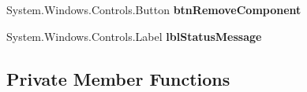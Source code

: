 \begin{DoxyCompactItemize}
\item 
System.\+Windows.\+Controls.\+Button {\bfseries btn\+Remove\+Component}\hypertarget{class_p_c_builder_forms_1_1_main_window_a99287688d292de9d63ae8bd57d2c38ca}{}\label{class_p_c_builder_forms_1_1_main_window_a99287688d292de9d63ae8bd57d2c38ca}

\item 
System.\+Windows.\+Controls.\+Label {\bfseries lbl\+Status\+Message}\hypertarget{class_p_c_builder_forms_1_1_main_window_ac4321e76328a9635021287bac82b6a89}{}\label{class_p_c_builder_forms_1_1_main_window_ac4321e76328a9635021287bac82b6a89}

\end{DoxyCompactItemize}
\subsection*{Private Member Functions}
